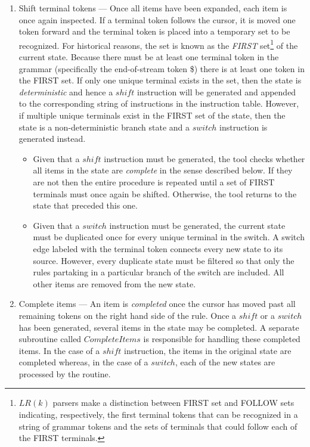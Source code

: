 \documentclass[a4paper,11pt]{article}
\begin{document}
\begin{enumerate}
\item Shift terminal tokens --- Once all items have been expanded, each item is once again inspected. 
If a terminal token follows the cursor, it is moved one token forward and the terminal token is placed into a temporary set to be recognized.
For historical reasons, the set is known as the \emph{FIRST} set\footnote{$LR(k)$ parsers make a distinction between FIRST set and FOLLOW sets indicating, respectively, 
the first terminal tokens that can be recognized in a string of grammar tokens and the sets of terminals that could follow each of the FIRST terminals.} of the current state.
Because there must be at least one terminal token in the grammar (specifically the end-of-stream token \$) there is at least one token in the FIRST set.
If only one unique terminal exists in the set, then the state is \emph{deterministic} and hence a $shi\!ft$ instruction will be generated and appended to the corresponding string of instructions in the instruction table.
However, if multiple unique terminals exist in the FIRST set of the state, then the state is a non-deterministic branch state and a $switch$ instruction is generated instead.
\begin{itemize}
\item Given that a $shi\!ft$ instruction must be generated, the tool checks whether all items in the state are \emph{complete} in the sense described below. 
If they are not then the entire procedure is repeated until a set of FIRST terminals must once again be shifted. 
Otherwise, the tool returns to the state that preceded this one.
\item Given that a $switch$ instruction must be generated, the current state must be duplicated once for every unique terminal in the switch. 
A switch edge labeled with the terminal token connects every new state to its source.
However, every duplicate state must be filtered so that only the rules partaking in a particular branch of the switch are included.
All other items are removed from the new state. %
\end{itemize}

\item Complete items --- An item is \emph{completed} once the cursor has moved past all remaining tokens on the right hand side of the rule.
Once a $shi\!ft$ or a $switch$ has been generated, several items in the state may be completed. 
A separate subroutine called $CompleteItems$ is responsible for handling these completed items.
In the case of a $shi\!ft$ instruction, the items in the original state are completed whereas, in the case of a $switch$, each of the new states are processed by the routine.\\


\end{enumerate}
\end{document}
